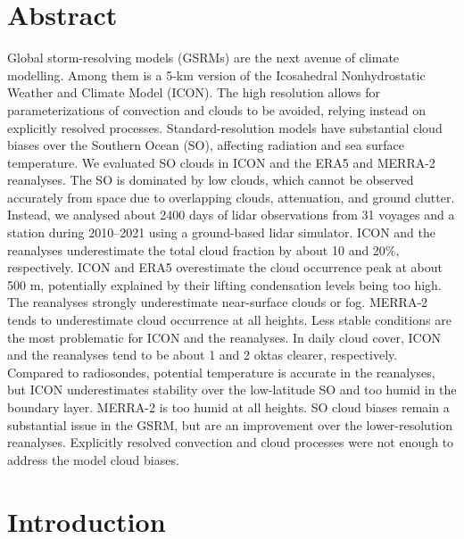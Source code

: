 \documentclass[12pt,a4paper]{article}
\begin{document}
\section*{Abstract}

Global storm-resolving models (GSRMs) are the next avenue of climate modelling.
Among them is a 5-km version of the Icosahedral Nonhydrostatic Weather and
Climate Model (ICON). The high resolution allows for parameterizations of
convection and clouds to be avoided, relying instead on explicitly resolved
processes.  Standard-resolution models have substantial cloud biases over the
Southern Ocean (SO), affecting radiation and sea surface temperature.  We
evaluated SO clouds in ICON and the ERA5 and MERRA-2 reanalyses.  The SO is
dominated by low clouds, which cannot be observed accurately from space due to
overlapping clouds, attenuation, and ground clutter.  Instead, we analysed
about 2400 days of lidar observations from 31 voyages and a station during
2010--2021 using a ground-based lidar simulator.  ICON and the reanalyses
underestimate the total cloud fraction by about 10 and 20\%, respectively. ICON
and ERA5 overestimate the cloud occurrence peak at about 500 m, potentially
explained by their lifting condensation levels being too high.  The reanalyses
strongly underestimate near-surface clouds or fog.  MERRA-2 tends to
underestimate cloud occurrence at all heights. Less stable conditions are the
most problematic for ICON and the reanalyses.  In daily cloud cover, ICON and
the reanalyses tend to be about 1 and 2 oktas clearer, respectively. Compared
to radiosondes, potential temperature is accurate in the reanalyses, but ICON
underestimates stability over the low-latitude SO and too humid in the boundary
layer. MERRA-2 is too humid at all heights. SO cloud biases remain a
substantial issue in the GSRM, but are an improvement over the lower-resolution
reanalyses. Explicitly resolved convection and cloud processes were not enough
to address the model cloud biases.

\section{Introduction}
\label{sec:introduction}
\end{document}
